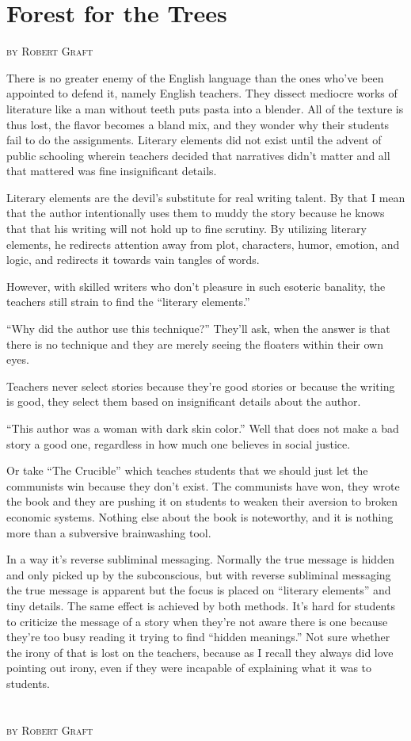 \section{Forest for the Trees}
\begin{flushright}
\textsc{
by Robert Graft}
\end{flushright}
There is no greater enemy of the English language than the ones who've been appointed to defend it, namely English teachers. They dissect mediocre works of literature like a man without teeth puts pasta into a blender. All of the texture is thus lost, the flavor becomes a bland mix, and they wonder why their students fail to do the assignments.
Literary elements did not exist until the advent of public schooling wherein teachers decided that narratives didn't matter and all that mattered was fine insignificant details.

Literary elements are the devil's substitute for real writing talent. By that I mean that the author intentionally uses them to muddy the story because he knows that that his writing will not hold up to fine scrutiny. By utilizing literary elements, he redirects attention away from plot, characters, humor, emotion, and logic, and redirects it towards vain tangles of words.

However, with skilled writers who don't pleasure in such esoteric banality, the teachers still strain to find the ``literary elements.''

``Why did the author use this technique?'' They'll ask, when the answer is that there is no technique and they are merely seeing the floaters within their own eyes.

Teachers never select stories because they're good stories or because the writing is good, they select them based on insignificant details about the author.

``This author was a woman with dark skin color.'' Well that does not make a bad story a good one, regardless in how much one believes in social justice.

Or take ``The Crucible'' which teaches students that we should just let the communists win because they don't exist.
The communists have won, they wrote the book and they are pushing it on students to weaken their aversion to broken economic systems. Nothing else about the book is noteworthy, and it is nothing more than a subversive brainwashing tool.

In a way it's reverse subliminal messaging. Normally the true message is hidden and only picked up by the subconscious, but with reverse subliminal messaging the true message is apparent but the focus is placed on ``literary elements'' and tiny details. The same effect is achieved by both methods. It's hard for students to criticize the message of a story when they're not aware there is one because they're too busy reading it trying to find ``hidden meanings.'' Not sure whether the irony of that is lost on the teachers, because as I recall they always did love pointing out irony, even if they were incapable of explaining what it was to students.

\section{}
\begin{flushright}
\textsc{
by Robert Graft}
\end{flushright}
